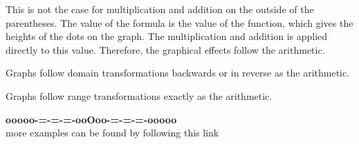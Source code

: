 \documentclass{ximera}
\begin{document}
This is not the case for multiplication and addition on the outside of the parentheses.  The value of the formula is the value of the function, which gives the heights of the dots on the graph.  The multiplication and addition is applied directly to this value.  Therefore, the graphical effects follow the arithmetic.


\begin{center}

Graphs follow domain transformations backwards or in reverse as the arithmetic.


\end{center}


\begin{center}

Graphs follow range transformations exactly as the arithmetic.


\end{center}



































\begin{center}
\textbf{\textcolor{green!50!black}{ooooo-=-=-=-ooOoo-=-=-=-ooooo}} \\

more examples can be found by following this link\\ 

\end{center}
\end{document}
